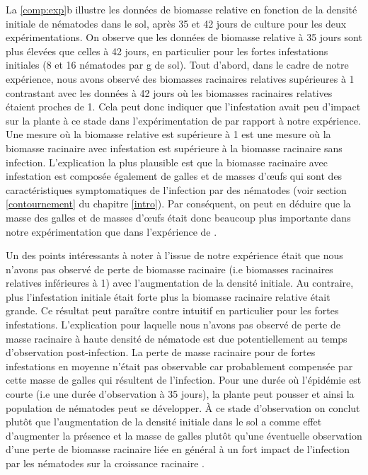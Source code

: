 	
	La   \autoref{comp:exp}b illustre les données de biomasse relative  en fonction de la densité initiale de nématodes dans le sol, après  35 et 42  jours de culture pour les deux expérimentations.
On observe que les données  de biomasse relative à 35 jours sont plus élevées
que celles à 42 jours, en particulier pour les fortes infestations initiales (8 et 16  nématodes par g
de sol). Tout d'abord, dans le cadre de notre expérience, nous avons  observé des biomasses racinaires relatives supérieures à 1 contrastant avec les données à 42 jours où les biomasses racinaires relatives étaient  proches de 1. Cela peut donc indiquer  que l’infestation avait peu d’impact sur la plante à ce stade dans l'expérimentation de \citet{Ehwaeti1998} par rapport à notre expérience. 
Une  mesure où la biomasse relative est supérieure à 1 est une mesure où la biomasse racinaire avec infestation est supérieure à la biomasse racinaire sans infection. L'explication la plus plausible est que la biomasse racinaire avec infestation est composée également de galles et de masses d’œufs qui sont des caractéristiques symptomatiques de l'infection par des nématodes (voir section \ref{contournement} du chapitre \ref{intro}). Par conséquent,
on peut en déduire que la masse  des galles et de masses d’œufs  était  donc beaucoup plus importante dans notre expérimentation que dans l'expérience de \citet{Ehwaeti1998}. 
	
	Un des points intéressants à noter à l'issue de  notre expérience  était que nous n'avons pas observé de perte de biomasse racinaire (i.e biomasses racinaires relatives inférieures à 1) avec l'augmentation de la densité initiale. Au contraire, plus l'infestation initiale était forte  plus la biomasse racinaire relative était grande. Ce résultat peut paraître contre intuitif en particulier pour les fortes infestations.    L'explication pour laquelle nous n'avons pas observé de perte  de masse  racinaire  à haute densité de nématode est  due potentiellement au temps d'observation post-infection.  La perte de masse racinaire pour de fortes infestations en moyenne n'était pas observable car  probablement compensée par cette masse de galles qui résultent de l'infection.  Pour une
durée où l'épidémie est courte (i.e une durée d'observation à 35 jours),  la plante peut pousser  et ainsi la population de nématodes peut se développer. À ce stade d'observation on conclut plutôt que l'augmentation de la densité initiale dans le sol a  comme effet d'augmenter la présence et la masse de galles  plutôt qu'une éventuelle observation d'une perte de biomasse racinaire liée en général à un fort impact de l'infection par les nématodes sur la croissance racinaire  \citep{Ehwaeti1998}.  
	
